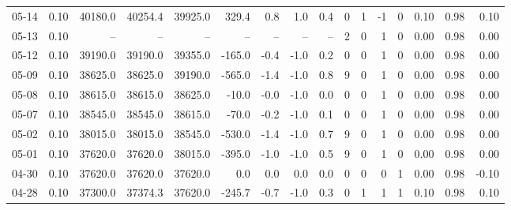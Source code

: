 \begin{threeparttable}
{\begin{tabular}{lrrrrrrrrrrrrrrr}
  05-14 &     0.10 & 40180.0 & 40254.4 & 39925.0 &      329.4 &            0.8 &                      1.0 &                 0.4 &              0 &         1 &    -1 &         0 &       0.10 &      0.98 &           0.10 \\
  05-13 &     0.10 &      -- &      -- &      -- &         -- &             -- &                       -- &                  -- &              2 &         0 &     1 &         0 &       0.00 &      0.98 &           0.00 \\
  05-12 &     0.10 & 39190.0 & 39190.0 & 39355.0 &     -165.0 &           -0.4 &                     -1.0 &                 0.2 &              0 &         0 &     1 &         0 &       0.00 &      0.98 &           0.00 \\
  05-09 &     0.10 & 38625.0 & 38625.0 & 39190.0 &     -565.0 &           -1.4 &                     -1.0 &                 0.8 &              9 &         0 &     1 &         0 &       0.00 &      0.98 &           0.00 \\
  05-08 &     0.10 & 38615.0 & 38615.0 & 38625.0 &      -10.0 &           -0.0 &                     -1.0 &                 0.0 &              0 &         0 &     1 &         0 &       0.00 &      0.98 &           0.00 \\
  05-07 &     0.10 & 38545.0 & 38545.0 & 38615.0 &      -70.0 &           -0.2 &                     -1.0 &                 0.1 &              0 &         0 &     1 &         0 &       0.00 &      0.98 &           0.00 \\
  05-02 &     0.10 & 38015.0 & 38015.0 & 38545.0 &     -530.0 &           -1.4 &                     -1.0 &                 0.7 &              9 &         0 &     1 &         0 &       0.00 &      0.98 &           0.00 \\
  05-01 &     0.10 & 37620.0 & 37620.0 & 38015.0 &     -395.0 &           -1.0 &                     -1.0 &                 0.5 &              9 &         0 &     1 &         0 &       0.00 &      0.98 &           0.00 \\
  04-30 &     0.10 & 37620.0 & 37620.0 & 37620.0 &        0.0 &            0.0 &                      0.0 &                 0.0 &              0 &         0 &     0 &         1 &       0.00 &      0.98 &          -0.10 \\
  04-28 &     0.10 & 37300.0 & 37374.3 & 37620.0 &     -245.7 &           -0.7 &                     -1.0 &                 0.3 &              0 &         1 &     1 &         1 &       0.10 &      0.98 &           0.10 \\

\end{tabular}}
\end{threeparttable}
